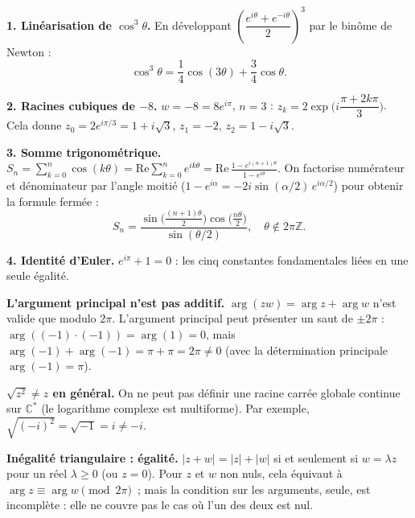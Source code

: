
\begin{mdframed}[style=exbar]
  \textbf{1. Linéarisation de $\cos^3\theta$.}\enspace%
  En développant $\left(\dfrac{e^{i\theta}+e^{-i\theta}}{2}\right)^3$ par le
  binôme de Newton :
  \[
    \cos^3\theta = \frac{1}{4}\cos(3\theta) + \frac{3}{4}\cos\theta.
  \]

  \smallskip\noindent
  \textbf{2. Racines cubiques de $-8$.}\enspace%
  $w = -8 = 8e^{i\pi}$, $n = 3$ : $z_k = 2\exp\!\bigl(i\dfrac{\pi + 2k\pi}{3}\bigr)$.
  Cela donne $z_0 = 2e^{i\pi/3} = 1 + i\sqrt{3}$, $z_1 = -2$,
  $z_2 = 1 - i\sqrt{3}$.

  \smallskip\noindent
  \textbf{3. Somme trigonométrique.}\enspace%
  $\displaystyle S_n = \sum_{k=0}^{n} \cos(k\theta) = \mathrm{Re}\!\sum_{k=0}^n e^{ik\theta}
  = \mathrm{Re}\,\frac{1 - e^{i(n+1)\theta}}{1 - e^{i\theta}}$.
  On factorise numérateur et dénominateur par l'angle moitié
  ($1 - e^{i\alpha} = -2i\sin(\alpha/2)\,e^{i\alpha/2}$) pour obtenir la
  formule fermée :
  \[
    S_n = \frac{\sin\!\big(\frac{(n+1)\theta}{2}\big)\cos\!\big(\frac{n\theta}{2}\big)}
               {\sin(\theta/2)}, \quad \theta \notin 2\pi\mathbb{Z}.
  \]

  \smallskip\noindent
  \textbf{4. Identité d'Euler.}\enspace%
  $e^{i\pi} + 1 = 0$ : les cinq constantes fondamentales liées en une seule
  égalité.
\end{mdframed}


\begin{mdframed}[style=cexbar]
  \textbf{L'argument principal n'est pas additif.}\enspace%
  $\arg(zw) = \arg z + \arg w$ n'est valide que modulo $2\pi$. L'argument
  principal peut présenter un saut de $\pm 2\pi$ : $\arg((-1)\cdot(-1)) =
  \arg(1) = 0$, mais $\arg(-1) + \arg(-1) = \pi + \pi = 2\pi \neq 0$
  (avec la détermination principale $\arg(-1) = \pi$).

  \smallskip\noindent
  \textbf{$\sqrt{z^2} \neq z$ en général.}\enspace%
  On ne peut pas définir une racine carrée globale continue sur $\mathbb{C}^*$
  (le logarithme complexe est multiforme). Par exemple,
  $\sqrt{(-i)^2} = \sqrt{-1} = i \neq -i$.

  \smallskip\noindent
  \textbf{Inégalité triangulaire : égalité.}\enspace%
  $|z + w| = |z| + |w|$ si et seulement si $w = \lambda z$ pour un réel
  $\lambda \geq 0$ (ou $z = 0$). Pour $z$ et $w$ non nuls, cela équivaut à
  $\arg z \equiv \arg w \pmod{2\pi}$~; mais la condition sur les arguments,
  seule, est incomplète : elle ne couvre pas le cas où l'un des deux est nul.
\end{mdframed}

